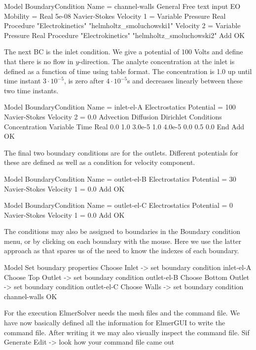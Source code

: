 \ttbegin
Model
  BoundaryCondition
    Name = channel-walls
    General
      Free text input
        EO Mobility = Real 5e-08
    Navier-Stokes 
      Velocity 1 = Variable Pressure
         Real Procedure  "Electrokinetics" "helmholtz_smoluchowski1"
      Velocity 2 = Variable Pressure
         Real Procedure  "Electrokinetics" "helmholtz_smoluchowski2"
    Add
    OK
\ttend  

The next BC is the inlet condition. We give a potential of 100 Volts and define that there is no flow in $y$-direction. The analyte concentration at the inlet is defined as a function of time using table format. The concentration is 1.0 up until time instant $3\cdot 10^{-5}$, is zero after $4\cdot 10^{-5}$s and decreases linearly between these two time instants.

\ttbegin
Model
  BoundaryCondition
    Name = inlet-el-A
    Electrostatics
     Potential = 100
    Navier-Stokes 
      Velocity 2 = 0.0
    Advection Diffusion
      Dirichlet Conditions
        Concentration
            Variable Time
              Real
              0.0     1.0
              3.0e-5  1.0
              4.0e-5  0.0
              0.5     0.0
           End           
    Add
   OK 
\ttend   

The final two boundary conditions are for the outlets. Different potentials for these are defined as well as a condition for velocity component.

\ttbegin
Model
  BoundaryCondition
    Name = outlet-el-B
    Electrostatics
     Potential = 30
    Navier-Stokes 
      Velocity 1 = 0.0         
    Add
   OK 
\ttend   

\ttbegin
Model
  BoundaryCondition
    Name = outlet-el-C
    Electrostatics
     Potential = 0
    Navier-Stokes 
      Velocity 1 = 0.0         
    Add
   OK 
\ttend   

The conditions may also be assigned to boundaries in the Boundary condition menu, or by clicking on each boundary with the mouse. Here we use the latter approach as that spares us of the need to know the indexes of each boundary.

\ttbegin
Model
  Set boundary properties
    Choose Inlet -> set boundary condition inlet-el-A
    Choose Top Outlet -> set boundary condition outlet-el-B
    Choose Bottom Outlet -> set boundary condition outlet-el-C
    Choose Walls -> set boundary condition channel-walls
   OK 
\ttend

For the execution ElmerSolver needs the mesh files and the command file.  We have now basically defined all the information for ElmerGUI to write the command file. After writing it we may also visually inspect the command file.
\ttbegin
Sif 
  Generate
  Edit -> look how your command file came out  
\ttend

